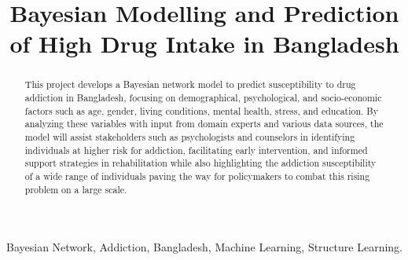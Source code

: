 \documentclass[conference]{IEEEtran}
\begin{document}
\title{Bayesian Modelling and Prediction of High Drug Intake  in Bangladesh\\
}

\author{
\and
{}
\and
{}
}

\maketitle

\begin{abstract}
This project develops a Bayesian network model to predict susceptibility to drug addiction in Bangladesh, focusing on demographical, psychological, and socio-economic factors such as age, gender, living conditions, mental health, stress, and education. By analyzing these variables with input from domain experts and various data sources, the model will assist stakeholders such as psychologists and counselors in identifying individuals at higher risk for addiction, facilitating early intervention, and informed support strategies in rehabilitation while also highlighting the addiction susceptibility of a wide range of individuals paving the way for policymakers to combat this rising problem on a large scale.\end{abstract}

\begin{IEEEkeywords}
Bayesian Network, Addiction, Bangladesh, Machine Learning, Structure Learning.
\end{IEEEkeywords}
\end{document}
